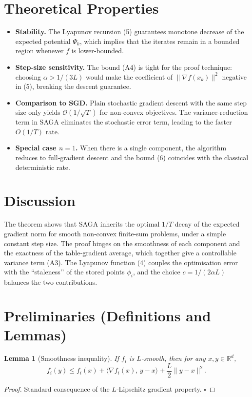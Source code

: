 \documentclass{article}
\newtheorem{lemma}{Lemma}
\newcommand{\R}{\mathbb{R}}
\begin{document}
\section*{Theoretical Properties}
\begin{itemize}
    \item \textbf{Stability.} The Lyapunov recursion (5) guarantees monotone decrease of the expected potential $\Psi_k$, which implies that the iterates remain in a bounded region whenever $f$ is lower‑bounded.
    \item \textbf{Step‑size sensitivity.} The bound (A4) is tight for the proof technique: choosing $\alpha>1/(3L)$ would make the coefficient of $\|\nabla f(x_k)\|^{2}$ negative in (5), breaking the descent guarantee.
    \item \textbf{Comparison to SGD.} Plain stochastic gradient descent with the same step size only yields $\mathcal{O}(1/\sqrt{T})$ for non‑convex objectives. The variance‑reduction term in SAGA eliminates the stochastic error term, leading to the faster $O(1/T)$ rate.
    \item \textbf{Special case $n=1$.} When there is a single component, the algorithm reduces to full‑gradient descent and the bound (6) coincides with the classical deterministic rate.
\end{itemize}

\section*{Discussion}
The theorem shows that SAGA inherits the optimal $1/T$ decay of the expected gradient norm for smooth non‑convex finite‑sum problems, under a simple constant step size. The proof hinges on the smoothness of each component and the exactness of the table‑gradient average, which together give a controllable variance term (A3). The Lyapunov function (4) couples the optimisation error with the “staleness’’ of the stored points $\phi_i$, and the choice $c=1/(2\alpha L)$ balances the two contributions.

\newpage
\section*{Preliminaries (Definitions and Lemmas)}
\begin{lemma}[Smoothness inequality]\label{lem:smooth}
If $f_i$ is $L$‑smooth, then for any $x,y\in\R^{d}$,
\[
f_i(y)\le f_i(x)+\langle\nabla f_i(x),\,y-x\rangle+\frac{L}{2}\|y-x\|^{2}.
\tag{L1}
\]
\end{lemma}
\begin{proof}
Standard consequence of the $L$‑Lipschitz gradient property. $\square$
\end{proof}
\end{document}
